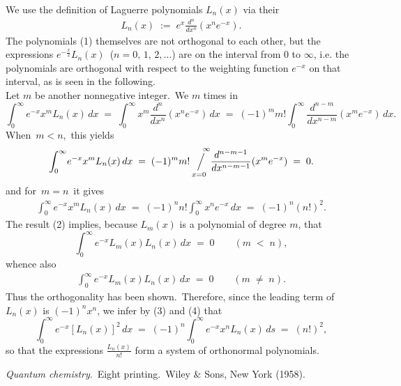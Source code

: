 \documentclass[12pt]{article}
\newcommand{\sijoitus}[2]%
{\operatornamewithlimits{\Big/}_{\!\!\!#1}^{\,#2}}
\begin{document}
We use the definition of Laguerre polynomials $L_n(x)$ via their 
\begin{align}
L_n(x) \;:=\; e^x\frac{d^n}{dx^n}(x^ne^{-x}).
\end{align}
The polynomials (1) themselves are not orthogonal to each other, but the expressions $e^{-\frac{x}{2}}L_n(x)$\, ($n = 0,\,1,\,2,\ldots$) are  on the interval from 0 to $\infty$, i.e. the polynomials are orthogonal with respect to the weighting function $e^{-x}$ on that interval, as is seen in the following.\\


Let $m$ be another nonnegative integer.\, We  $m$ times in
$$\int_0^\infty\!e^{-x}x^mL_n(x)\,dx \;=\; \int_0^\infty\!x^m\frac{d^n}{dx^n}(x^ne^{-x})\,dx 
\;=\; (-1)^mm!\int_0^\infty\!\frac{d^{n-m}}{dx^{n-m}}(x^me^{-x})\,dx.$$
When\, $m < n$,\, this yields
\begin{align}
\int_0^\infty\!e^{-x}x^mL_n(x)\,dx \;=\; 
(-1)^mm!\sijoitus{x=0}{\quad \infty}\!\frac{d^{n-m-1}}{dx^{n-m-1}}(x^me^{-x}) \;=\; 0.
\end{align}
and for\, $m = n$\, it gives
\begin{align}
\int_0^\infty\!e^{-x}x^mL_n(x)\,dx \;=\; (-1)^nn!\int_0^\infty\!x^ne^{-x}\,dx \;=\; (-1)^n(n!)^2.
\end{align}
The result (2) implies, because $L_m(x)$ is a polynomial of degree $m$, that
$$\int_0^\infty\!e^{-x}L_m(x)L_n(x)\,dx \;=\; 0 \qquad (m \;<\; n),$$
whence also
\begin{align}
\int_0^\infty\!e^{-x}L_m(x)L_n(x)\,dx \;=\; 0 \qquad (m \;\neq\; n).
\end{align}
Thus the orthogonality has been shown.\, Therefore, since the leading term of $L_n(x)$ is $(-1)^nx^n$, we infer by (3) and (4) that 
$$\int_0^\infty\!e^{-x}[L_n(x)]^2\,dx \;=\; (-1)^n\!\int_0^\infty\!e^{-x}x^nL_n(x)\,ds \;=\; (n!)^2,$$
so that the expressions $\frac{L_n(x)}{n!}$ form a system of orthonormal polynomials.\\

\begin{thebibliography}{9}
 {\em Quantum chemistry}.\, Eight printing.\, Wiley \& Sons, New York (1958).
\end{thebibliography}



\end{document}
